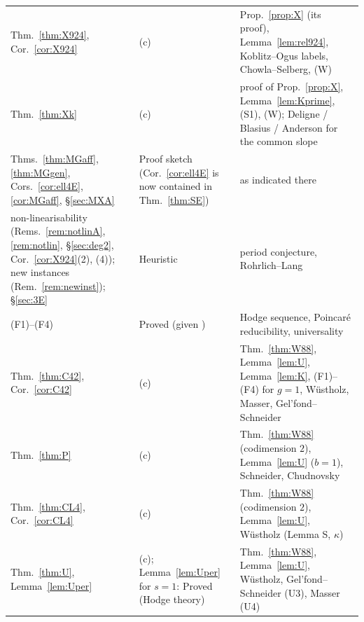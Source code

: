 \documentclass[11pt]{amsart}
\theoremstyle{definition}
\begin{document}
{\begin{longtable}{>{\raggedright\arraybackslash}p{3.3cm}>{\raggedright\arraybackslash}p{4.4cm}>{\raggedright\arraybackslash}p{6.2cm}}
Thm.~\ref{thm:X924}, Cor.~\ref{cor:X924} & (c) & Prop.~\ref{prop:X} (its proof), Lemma~\ref{lem:rel924}, Koblitz--Ogus labels, Chowla--Selberg, (W)\\
Thm.~\ref{thm:Xk} & (c) & proof of Prop.~\ref{prop:X}, Lemma~\ref{lem:Kprime}, (S1), (W); Deligne / Blasius / Anderson for the common slope\\
Thms.~\ref{thm:MGaff}, \ref{thm:MGgen}, Cors.~\ref{cor:ell4E}, \ref{cor:MGaff}, \S\ref{sec:MXA} & Proof sketch (Cor.~\ref{cor:ell4E} is now contained in Thm.~\ref{thm:SE}) & as indicated there\\
non-linearisability (Rems.~\ref{rem:notlinA}, \ref{rem:notlin}, \S\ref{sec:deg2}, Cor.~\ref{cor:X924}(2), (4)); new instances (Rem.~\ref{rem:newinst}); \S\ref{sec:3E} & Heuristic & period conjecture, Rohrlich--Lang\\
(F1)--(F4) & Proved (given \cite{MM74}) & Hodge sequence, Poincar\'e reducibility, universality\\
Thm.~\ref{thm:C42}, Cor.~\ref{cor:C42} & (c) & Thm.~\ref{thm:W88}, Lemma~\ref{lem:U}, Lemma~\ref{lem:K}, (F1)--(F4) for $g=1$, W\"ustholz, Masser, Gel'fond--Schneider\\
Thm.~\ref{thm:P} & (c) & Thm.~\ref{thm:W88} (codimension $2$), Lemma~\ref{lem:U} ($b=1$), Schneider, Chudnovsky\\
Thm.~\ref{thm:CL4}, Cor.~\ref{cor:CL4} & (c) & Thm.~\ref{thm:W88} (codimension $2$), Lemma~\ref{lem:U}, W\"ustholz (Lemma S, $\kappa$)\\
Thm.~\ref{thm:U}, Lemma~\ref{lem:Uper} & (c); Lemma~\ref{lem:Uper} for $s=1$: Proved (Hodge theory) & Thm.~\ref{thm:W88}, Lemma~\ref{lem:U}, W\"ustholz, Gel'fond--Schneider (U3), Masser (U4)
\end{longtable}
}
\end{document}
